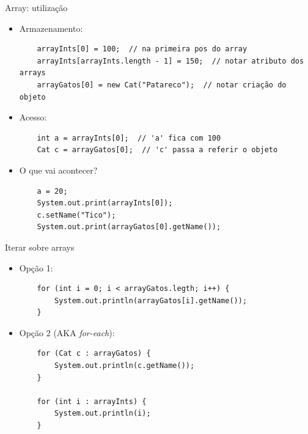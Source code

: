 \documentclass[portuguese, aspectratio=169, xcolor=table]{beamer}
\begin{document}
\begin{frame}[fragile]{Array: utilização}
\begin{itemize}
    \item Armazenamento:
    \begin{verbatim}
    arrayInts[0] = 100;  // na primeira pos do array
    arrayInts[arrayInts.length - 1] = 150;  // notar atributo dos arrays
    arrayGatos[0] = new Cat("Patareco");  // notar criação do objeto
    \end{verbatim}
    \item Acesso:
\begin{verbatim}
    int a = arrayInts[0];  // 'a' fica com 100
    Cat c = arrayGatos[0];  // 'c' passa a referir o objeto
\end{verbatim}
\item O que vai acontecer?
\begin{verbatim}
    a = 20;
    System.out.print(arrayInts[0]);
    c.setName("Tico");
    System.out.print(arrayGatos[0].getName());
\end{verbatim}
\end{itemize}
\end{frame}


\begin{frame}[fragile]{Iterar sobre arrays}
\begin{itemize}
\item Opção 1:
\begin{verbatim}
    for (int i = 0; i < arrayGatos.legth; i++) {
        System.out.println(arrayGatos[i].getName());
    }
\end{verbatim}
\item Opção 2 (AKA \textit{for-each}):
\begin{verbatim}
    for (Cat c : arrayGatos) {
        System.out.println(c.getName());
    }

    for (int i : arrayInts) {
        System.out.println(i);
    }
\end{verbatim}
\end{itemize}
\end{frame}
\end{document}
